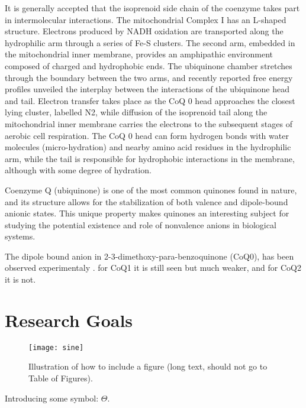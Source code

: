 It is generally accepted
that the isoprenoid side chain of the coenzyme takes part in intermolecular interactions. The mitochondrial Complex I has
an L-shaped structure. Electrons produced by NADH oxidation are
transported along the hydrophilic arm through a series of Fe-S
clusters. The second arm, embedded in the mitochondrial inner
membrane, provides an amphipathic environment composed of
charged and hydrophobic ends. The ubiquinone chamber stretches
through the boundary between the two arms, and recently
reported free energy profiles unveiled the interplay between the
interactions of the ubiquinone head and tail. Electron transfer
takes place as the CoQ 0 head approaches the closest lying cluster,
labelled N2, while diffusion of the isoprenoid tail along the mitochondrial inner membrane carries the electrons to the subsequent
stages of aerobic cell respiration. The CoQ 0 head can form hydrogen
bonds with water molecules (micro-hydration) and nearby amino
acid residues in the hydrophilic arm, while the tail is responsible for hydrophobic interactions in the membrane, although with some degree of hydration.

Coenzyme Q (ubiquinone) is one of the most common quinones found in nature, and its structure allows for the stabilization of both valence and dipole-bound anionic states. This unique property makes quinones an interesting subject for studying the potential existence and role of nonvalence anions in biological systems.

The dipole bound anion in 2-3-dimethoxy-para-benzoquinone (CoQ0), has been observed experimentaly \cite{ameixa2023parent,west2014anion,pshenichnyuk2020ionizing, bull2015anion}. for CoQ1 it is still seen but much weaker, and for CoQ2 it is not. 

\section{Research Goals}

\begin{figure}[th!]
  \centering
  \medskip
  \texttt{[image: sine]}
  \caption[Short caption for Table of Figures]{Illustration of how to
  include a figure (long text, should not go to Table of Figures).}
  \label{fig:sine}
\end{figure}

Introducing some symbol: $\Theta$.

